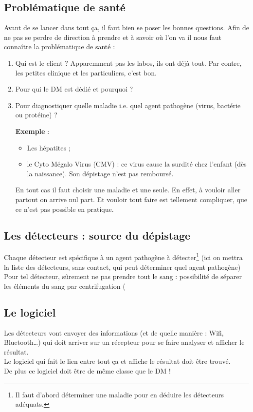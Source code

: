 \documentclass[a4paper,11pt]{article}
\newcounter{pte}
\newcounter{exe}
\newcommand{\exe}{\addtocounter{exe}{1}%
\noindent\textbf{Exemple \theexe } : }
\begin{document}
\begin{sloppypar}
\subsection{Problématique de santé}
Avant de se lancer dans tout ça, il faut bien se poser les bonnes questions. Afin de ne pas se perdre de direction à prendre et à savoir où
l'on va il nous faut connaître la problématique de santé :
\begin{enumerate}
 \item Qui est le client ?
 Apparemment pas les labos, ils ont déjà tout. Par contre, les petites clinique et les particuliers, c'est bon.
 \item Pour qui le DM est dédié et pourquoi ?
 \item Pour diagnostiquer quelle maladie i.e. quel agent pathogène (virus, bactérie ou protéine) ?\\
 
 \exe
 \begin{itemize}
  \item Les hépatites ;
  \item le Cyto Mégalo Virus (CMV) : ce virus cause la surdité chez l'enfant (dès la naissance). Son dépistage n'est pas remboursé.
 \end{itemize}
 \vspace{1.5ex}
 En tout cas il faut choisir une maladie et une seule. En effet, à vouloir aller partout on arrive nul part.
 Et vouloir tout faire est tellement compliquer, que ce n'est pas possible en pratique.
\end{enumerate}

\subsection{Les détecteurs : source du dépistage}
Chaque détecteur est spécifique à un agent pathogène à détecter\footnote{Il faut d'abord déterminer une maladie pour en déduire les détecteurs adéquats.}
(ici on mettra la liste des détecteurs, sans contact, qui peut déterminer quel agent pathogène)\\
Pour tel détecteur, sûrement ne pas prendre tout le sang : possibilité de séparer les éléments du sang par centrifugation (

\subsection{Le logiciel}
Les détecteurs vont envoyer des informations (et de quelle manière : Wifi, Bluetooth\dots) qui doit arriver sur un récepteur pour se faire analyser et afficher le résultat.\\
Le logiciel qui fait le lien entre tout ça et affiche le résultat doit être trouvé.\\
De plus ce logiciel doit être de même classe que le DM !


\end{sloppypar}
\end{document}
